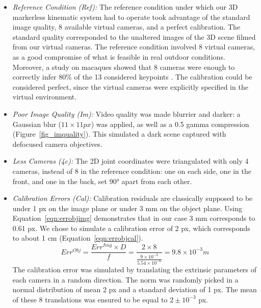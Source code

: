 \begin{itemize}[itemsep=0em, topsep=0em, leftmargin=*]
      \item \textit{Reference Condition (Ref):} The reference condition under which our 3D markerless kinematic system had to operate took advantage of the standard image quality, 8 available virtual cameras, and a perfect calibration. The standard quality corresponded to the unaltered images of the 3D scene filmed from our virtual cameras. The reference condition involved 8 virtual cameras, as a good compromise of what is feasible in real outdoor conditions. Moreover, a study on macaques showed that 8 cameras were enough to correctly infer 80\% of the 13 considered keypoints \cite{Bala2020}. The calibration could be considered perfect, since the virtual cameras were explicitly specified in the virtual environment.
      \item \textit{Poor Image Quality (Im):} Video quality was made blurrier and darker: a Gaussian blur (\(11 \times 11 px\)) was applied, as well as a 0.5 gamma compression (Figure~\ref{fig_imquality}). This simulated a dark scene captured with defocused camera objectives.
      \item \textit{Less Cameras (4c):} The 2D joint coordinates were triangulated with only 4 cameras, instead of 8 in the reference condition: one on each side, one in the front, and one in the back, set 90° apart from each other.
      \item \textit{Calibration Errors (Cal):} Calibration residuals are classically supposed to be under 1 px on the image plane or under 3 mm on the object plane. Using Equation~\ref{eqn:errobjimg} demonstrates that in our case 3 mm corresponds to 0.61 px. We chose to simulate a calibration error of 2 px, which corresponds to about 1 cm (Equation~\ref{eqn:errobjcal}).
      \begin{equation}
            Err^{Obj} = \frac{Err^{Img} \times D}{f} = \frac{2 \times 8}{\frac{9 \times 10^{-3}}{5.54 \times 10^{-6}}} = 9.8 \times 10^{-3} m
            \label{eqn:errobjcal}
      \end{equation} 
      The calibration error was simulated by translating the extrinsic parameters of each camera in a random direction. The norm was randomly picked in a normal distribution of mean 2 px and a standard deviation of 1 px. The mean of these 8 translations was ensured to be equal to \(2 ± 10^{-3}\) px.
\end{itemize}

